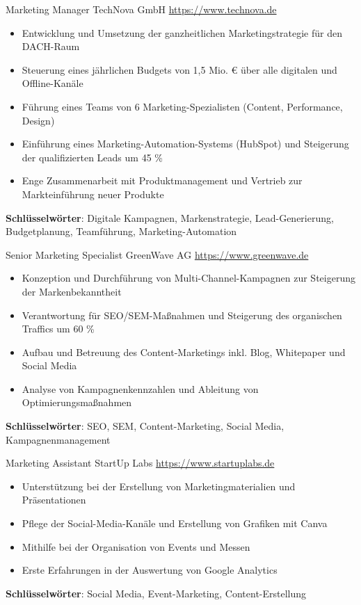 \documentclass[a4paper, serif, 10pt]{moderncv}
\begin{document}
        {Marketing Manager}
        {TechNova GmbH}
        {\url{https://www.technova.de}}
        {}
        {\begin{itemize}
\item Entwicklung und Umsetzung der ganzheitlichen Marketingstrategie für den DACH-Raum
\item Steuerung eines jährlichen Budgets von 1,5 Mio. € über alle digitalen und Offline-Kanäle
\item Führung eines Teams von 6 Marketing-Spezialisten (Content, Performance, Design)
\item Einführung eines Marketing-Automation-Systems (HubSpot) und Steigerung der qualifizierten Leads um 45 \%
\item Enge Zusammenarbeit mit Produktmanagement und Vertrieb zur Markteinführung neuer Produkte
\end{itemize}
\textbf{Schlüsselwörter}: Digitale Kampagnen, Markenstrategie, Lead-Generierung, Budgetplanung, Teamführung, Marketing-Automation}

        {Senior Marketing Specialist}
        {GreenWave AG}
        {\url{https://www.greenwave.de}}
        {}
        {\begin{itemize}
\item Konzeption und Durchführung von Multi-Channel-Kampagnen zur Steigerung der Markenbekanntheit
\item Verantwortung für SEO/SEM-Maßnahmen und Steigerung des organischen Traffics um 60 \%
\item Aufbau und Betreuung des Content-Marketings inkl. Blog, Whitepaper und Social Media
\item Analyse von Kampagnenkennzahlen und Ableitung von Optimierungsmaßnahmen
\end{itemize}
\textbf{Schlüsselwörter}: SEO, SEM, Content-Marketing, Social Media, Kampagnenmanagement}

        {Marketing Assistant}
        {StartUp Labs}
        {\url{https://www.startuplabs.de}}
        {}
        {\begin{itemize}
\item Unterstützung bei der Erstellung von Marketingmaterialien und Präsentationen
\item Pflege der Social-Media-Kanäle und Erstellung von Grafiken mit Canva
\item Mithilfe bei der Organisation von Events und Messen
\item Erste Erfahrungen in der Auswertung von Google Analytics
\end{itemize}
\textbf{Schlüsselwörter}: Social Media, Event-Marketing, Content-Erstellung}
\end{document}
